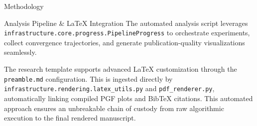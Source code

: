 \documentclass[
  ignorenonframetext,
]{beamer}
\begin{document}
\begin{frame}[fragile]{Methodology}
\begin{block}{Analysis Pipeline \& LaTeX Integration}
\protect{}\label{analysis-pipeline-latex-integration}
The automated analysis script leverages
\texttt{infrastructure.core.progress.PipelineProgress} to orchestrate
experiments, collect convergence trajectories, and generate
publication-quality visualizations seamlessly.

The research template supports advanced LaTeX customization through the
\texttt{preamble.md} configuration. This is ingested directly by
\texttt{infrastructure.rendering.latex\_utils.py} and
\texttt{pdf\_renderer.py}, automatically linking compiled PGF plots and
BibTeX citations. This automated approach ensures an unbreakable chain
of custody from raw algorithmic execution to the final rendered
manuscript.
\end{block}
\end{frame}
\end{document}

